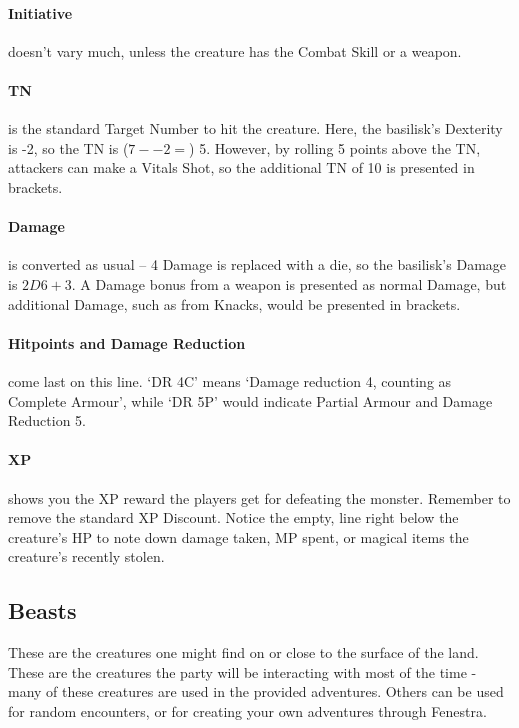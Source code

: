\paragraph{Initiative} doesn't vary much, unless the creature has the Combat Skill or a weapon.

\paragraph{TN} is the standard Target Number to hit the creature.  Here, the basilisk's Dexterity is -2, so the TN is ($7 -- 2 =$) 5.  However, by rolling 5 points above the TN, attackers can make a Vitals Shot, so the additional TN of 10 is presented in brackets.

\paragraph{Damage} is converted as usual -- 4 Damage is replaced with a die, so the basilisk's Damage is $2D6+3$.  A Damage bonus from a weapon is presented as normal Damage, but additional Damage, such as from Knacks, would be presented in brackets.

\paragraph{Hitpoints and Damage Reduction} come last on this line.  `DR 4C' means `Damage reduction 4, counting as Complete Armour', while `DR 5P' would indicate Partial Armour and Damage Reduction 5.

\paragraph{XP} shows you the XP reward the players get for defeating the monster.  Remember to remove the standard XP Discount.  Notice the empty, line right below the creature's HP to note down damage taken, MP spent, or magical items the creature's recently stolen.


\subsection{Beasts}

These are the creatures one might find on or close to the surface of the land.  These are the creatures the party will be interacting with most of the time - many of these creatures are used in the provided adventures.  Others can be used for random encounters, or for creating your own adventures through Fenestra.


